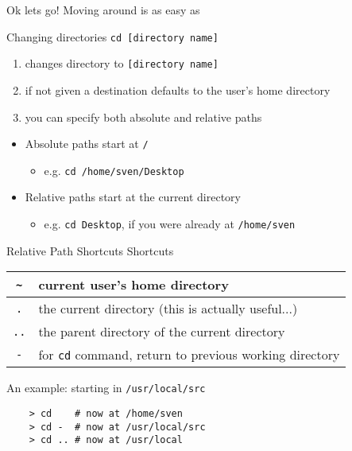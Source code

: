 \documentclass[11pt]{beamer}
\newcommand{\colbf}[1]{\textcolor{mLightBrown!77!black}{#1}}%
\begin{document}
\begin{frame}[fragile]{Ok lets go!}
  Moving around is as easy as

  \begin{block}{\colbf{C}hanging \colbf{d}irectories}
    \texttt{cd [directory name]}
    \begin{enumerate}[\--]
      \item changes directory to \texttt{[directory name]}
      \item if not given a destination defaults to the user's home directory
      \item you can specify both absolute and relative paths
    \end{enumerate}
    \vspace*{1em}
  \end{block}

  \begin{itemize}
    \item Absolute paths start at \texttt{/}
    \begin{itemize}
      \item e.g. \texttt{cd /home/sven/Desktop}
    \end{itemize}
    \item Relative paths start at the current directory
    \begin{itemize}
      \item e.g. \texttt{cd Desktop}, if you were already at \texttt{/home/sven}
    \end{itemize}
  \end{itemize}
\end{frame}

\begin{frame}[fragile]{Relative Path Shortcuts}
  Shortcuts

  \begin{tabular}{|c|l|}
    \hline
    \texttt{\textasciitilde} & current user's home directory\\ \hline
    \texttt{.} & the current directory (this is actually useful...)\\ \hline
    \texttt{..} & the parent directory of the current directory\\ \hline
    \texttt{-} & for \texttt{cd} command, return to previous working directory\\ \hline
  \end{tabular}

  An example: starting in \texttt{/usr/local/src}

  \begin{verbatim}
    > cd    # now at /home/sven
    > cd -  # now at /usr/local/src
    > cd .. # now at /usr/local
  \end{verbatim}

\end{frame}
%
\end{document}
